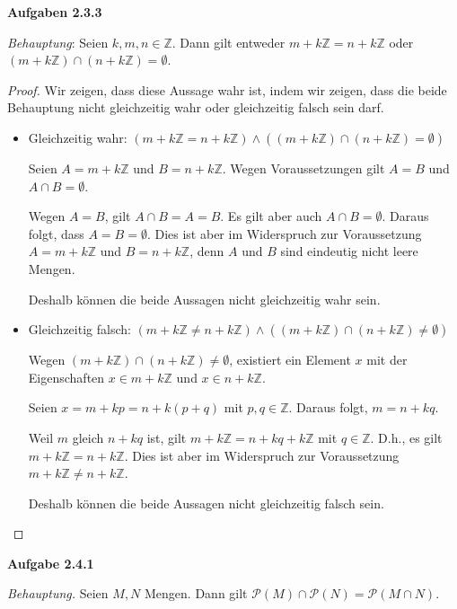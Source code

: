 \documentclass[12pt]{extarticle}
\begin{document}
\textbf{Aufgaben 2.3.3}

\textit{Behauptung}: Seien \(k, m, n \in \mathbb{Z}\).  Dann gilt
entweder \(m + k\mathbb{Z}=n+k\mathbb{Z}\) oder $(m+k\mathbb{Z}) \cap
(n+k\mathbb{Z})=\emptyset$.

\begin{proof}
  Wir zeigen, dass diese Aussage wahr ist, indem wir zeigen, dass die
  beide Behauptung nicht gleichzeitig wahr oder gleichzeitig falsch
  sein darf.

  \begin{itemize}
  \item Gleichzeitig wahr: $(m+k\mathbb{Z} = n+k\mathbb{Z}) \wedge
    ((m+k\mathbb{Z}) \cap (n+k\mathbb{Z})=\emptyset)$

    Seien \(A =m+k\mathbb{Z}\) und  \(B=n+k\mathbb{Z}\).  Wegen
    Voraussetzungen gilt \(A=B\) und \(A \cap B = \emptyset\).

    Wegen \(A=B\), gilt \(A \cap B = A = B\).  Es gilt aber auch
    \(A \cap B = \emptyset\).  Daraus folgt, dass \(A = B = \emptyset\).
    Dies ist aber im Widerspruch zur Voraussetzung \(A =m+k\mathbb{Z}\)
    und \(B=n+k\mathbb{Z}\), denn \(A\) und \(B\) sind eindeutig nicht
    leere Mengen.

    Deshalb können die beide Aussagen nicht gleichzeitig wahr sein.

  \item Gleichzeitig falsch: $(m+k\mathbb{Z} \neq n+k\mathbb{Z}) \wedge
    ((m+k\mathbb{Z}) \cap (n+k\mathbb{Z})\neq \emptyset)$

    Wegen \((m+k\mathbb{Z}) \cap (n+k\mathbb{Z})\neq \emptyset\),
    existiert ein Element \(x\) mit der Eigenschaften
    \(x \in m + k\mathbb{Z}\) und \(x \in n+k\mathbb{Z}\).

    Seien \(x = m+kp = n+k(p+q)\) mit \(p,q \in\mathbb{Z}\).  Daraus
    folgt, \(m=n+kq\).

    Weil \(m\) gleich \(n+kq\) ist, gilt \(m+k\mathbb{Z}=n+kq+k\mathbb{Z}\)
    mit \(q \in \mathbb{Z}\).  D.h., es gilt
    \(m + k\mathbb{Z} = n+k\mathbb{Z}\).  Dies ist aber im Widerspruch
    zur Voraussetzung \(m+k\mathbb{Z} \neq n+k\mathbb{Z}\).

    Deshalb können die beide Aussagen nicht gleichzeitig falsch sein.

  \end{itemize}
\end{proof}

\textbf{Aufgabe 2.4.1}

\textit{Behauptung.}  Seien \(M, N\) Mengen.  Dann gilt $\mathcal{P}(M)
\cap \mathcal{P}(N) = \mathcal{P}(M \cap N)$.
\end{document}
